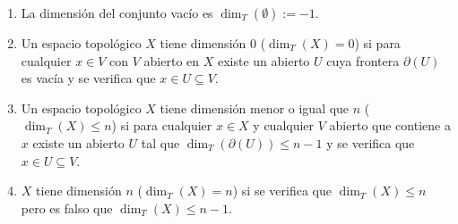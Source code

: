 \begin{enumerate}
\item La dimensión del conjunto vacío es $\dim_T(\emptyset):=-1$.
\item Un espacio topológico $X$ tiene dimensión 0 ($\dim_T(X)=0$) si para cualquier $x\in V$ con $V$ abierto en $X$ existe un abierto $U$ cuya frontera $\partial(U)$ es vacía y se verifica que $x\in U\subseteq V$.

\item Un espacio topológico $X$ tiene dimensión menor o igual que $n$ ($\dim_T(X)\leq n$) si para cualquier $x\in X$ y cualquier $V$ abierto que contiene a $x$ existe un abierto $U$ tal que $\dim_T(\partial(U))\leq n-1$ y se verifica que $x\in U\subseteq V$. 

\item $X$ tiene dimensión $n$ ($\dim_T(X)=n$) si se verifica que $\dim_T(X)\leq n$ pero es falso que $\dim_T(X)\leq n-1$.
\end{enumerate}

